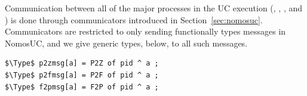 %

Communication between all of the major processes in the UC execution (\Z, \A, \partywrapper, and \fwrapper) is done through communicators introduced in Section~\ref{sec:nomosuc}.
Communicators are restricted to only sending functionally types messages in NomosUC, and we give generic types, below, to all such messages.
\begin{lstlisting}[basicstyle=\footnotesize\BeraMonottFamily, frame=single, mathescape]
$\Type$ p2zmsg[a] = P2Z of pid ^ a ;
$\Type$ p2fmsg[a] = P2F of pid ^ a ;
$\Type$ f2pmsg[a] = F2P of pid ^ a ;
\end{lstlisting}

